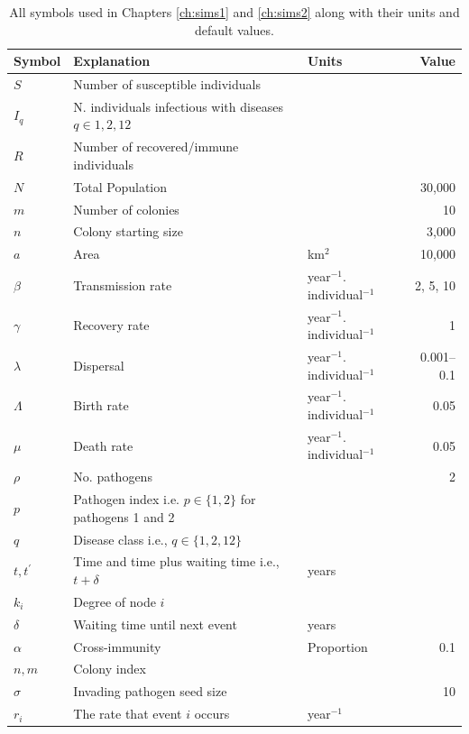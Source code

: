 

\begin{table}[b!]
\centering
\caption[All symbols used in Chapters \ref{ch:sims1} and \ref{ch:sims2}.]{All symbols used in Chapters \ref{ch:sims1} and \ref{ch:sims2} along with their units and default values.}

\begin{tabular}{@{}lp{6cm}p{2.9cm}r@{}}
\toprule
Symbol & Explanation & Units & Value\\
\midrule
$S$ & Number of susceptible individuals &&\\
$I_q$ & N. individuals infectious with diseases $q \in {1, 2, 12}$ &&\\
$R$ & Number of recovered/immune individuals &&\\
$N$ & Total Population && 30,000\\
$m$ & Number of colonies&& 10\\
$n$ & Colony starting size && 3,000\\
$a$ & Area & km$^2$& 10,000\\
$\beta$ & Transmission rate & year$^{-1}.$individual$^{-1}$ & 2, 5, 10\\
$\gamma$ & Recovery rate & year$^{-1}.$individual$^{-1}$ & 1\\
$\lambda$ & Dispersal & year$^{-1}.$individual$^{-1}$ & 0.001--0.1\\
$\Lambda$ & Birth rate & year$^{-1}.$individual$^{-1}$ & 0.05\\
$\mu$ & Death rate & year$^{-1}.$individual$^{-1}$ & 0.05\\
$\rho$ & No. pathogens && 2\\
$p$ &  Pathogen index i.e. $p\in\{1,2\}$ for pathogens 1 and 2 & &\\
$q$ & Disease class i.e., $q\in\{1,2,12\}$&\\
$t, t^\prime$ & Time and time plus waiting time i.e., $t+\delta$ & years &\\
$k_i$ & Degree of node $i$ &&\\
$\delta$ & Waiting time until next event & years &\\
$\alpha$ & Cross-immunity & Proportion& 0.1\\
$n, m$ & Colony index &&\\
$\sigma$ & Invading pathogen seed size & & 10\\
$r_i$ & The rate that event $i$ occurs & year$^{-1}$&\\
\bottomrule
\end{tabular}


\end{table}
